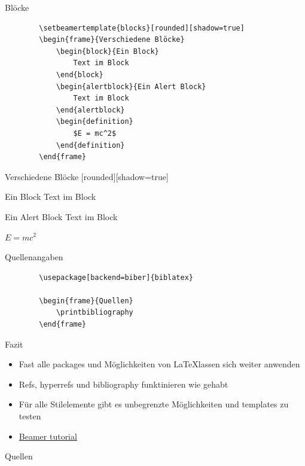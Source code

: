 \documentclass{beamer}
\begin{document}
\begin{frame}[containsverbatim]{Blöcke}
    \begin{lstlisting}
        \setbeamertemplate{blocks}[rounded][shadow=true]
        \begin{frame}{Verschiedene Blöcke}
            \begin{block}{Ein Block}
                Text im Block
            \end{block}
            \begin{alertblock}{Ein Alert Block}
                Text im Block
            \end{alertblock}
            \begin{definition}
                $E = mc^2$
            \end{definition}
        \end{frame}
    \end{lstlisting}
\end{frame}

\begin{frame}{Verschiedene Blöcke}
    [rounded][shadow=true]
    \begin{block}{Ein Block}
        Text im Block
    \end{block}
    \begin{alertblock}{Ein Alert Block}
        Text im Block
    \end{alertblock}
    \begin{definition}
        $E = mc^2$
    \end{definition}
\end{frame}

\begin{frame}[containsverbatim]{Quellenangaben}
    \begin{lstlisting}
        \usepackage[backend=biber]{biblatex}
        
        \begin{frame}{Quellen}
            \printbibliography
        \end{frame}
    \end{lstlisting}
\end{frame}

\begin{frame}{Fazit}
    \begin{itemize}
        \item Fast alle packages und Möglichkeiten von \LaTeX lassen sich weiter anwenden
        \item Refs, hyperrefs und bibliography funktinieren wie gehabt
        \item Für alle Stilelemente gibt es unbegrenzte Möglichkeiten und templates zu testen
        \item \href{https://www.overleaf.com/learn/latex/Beamer}{Beamer tutorial}
    \end{itemize}
\end{frame}

\begin{frame}{Quellen}
    \printbibliography
\end{frame}
\end{document}
